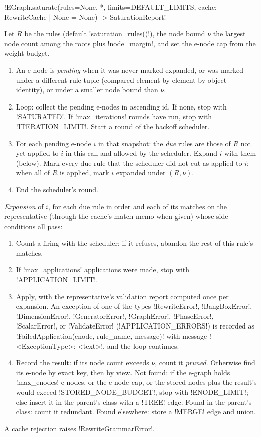 \begin{signature}
\py!EGraph.saturate(rules=None, *, limits=DEFAULT_LIMITS, cache: RewriteCache | None = None) -> SaturationReport!
\end{signature}
\begin{algorithm}[Saturation]\label{alg:rewriting-saturate}
Let $R$ be the rules (default \py!saturation_rules()!), the node bound $\nu$ the largest node count
among the roots plus \py!node_margin!, and set the e-node cap from the weight budget.
\begin{enumerate}
\item An e-node is \emph{pending} when it was never marked expanded, or was marked under a
  different rule tuple (compared element by element by object identity), or under a smaller node
  bound than $\nu$.
\item Loop: collect the pending e-nodes in ascending id. If none, stop with \code!SATURATED!. If
  \py!max_iterations! rounds have run, stop with \code!ITERATION_LIMIT!. Start a round of the
  backoff scheduler.
\item For each pending e-node $i$ in that snapshot: the \emph{due} rules are those of $R$ not yet
  applied to $i$ in this call and allowed by the scheduler. Expand $i$ with them (below). Mark every
  due rule that the scheduler did not cut as applied to $i$; when all of $R$ is applied, mark $i$
  expanded under $(R, \nu)$.
\item End the scheduler's round.
\end{enumerate}
\emph{Expansion} of $i$, for each due rule in order and each of its matches on the representative
(through the cache's match memo when given) whose side conditions all pass:
\begin{enumerate}
\item Count a firing with the scheduler; if it refuses, abandon the rest of this rule's matches.
\item If \py!max_applications! applications were made, stop with \code!APPLICATION_LIMIT!.
\item Apply, with the representative's validation report computed once per expansion. An exception
  of one of the types \py!RewriteError!, \py!BangBoxError!, \py!DimensionError!,
  \py!GeneratorError!, \py!GraphError!, \py!PhaseError!, \py!ScalarError!, or \py!ValidateError!
  (\py!APPLICATION_ERRORS!) is recorded as \py!FailedApplication(enode, rule_name, message)! with
  message \code!<ExceptionType>: <text>!, and the loop continues.
\item Record the result: if its node count exceeds $\nu$, count it \emph{pruned}. Otherwise find
  its e-node by exact key, then by view. Not found: if the e-graph holds \py!max_enodes! e-nodes, or
  the e-node cap, or the stored nodes plus the result's would exceed \py!STORED_NODE_BUDGET!, stop
  with \code!ENODE_LIMIT!; else insert it in the parent's class with a \code!TREE! edge. Found in the
  parent's class: count it redundant. Found elsewhere: store a \code!MERGE! edge and union.
\end{enumerate}
A cache rejection raises \py!RewriteGrammarError!.
\end{algorithm}

